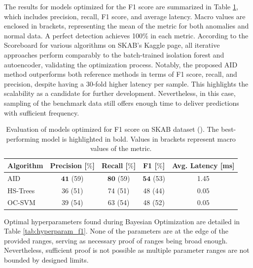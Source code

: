 The results for models optimized for the F1 score are summarized in Table \ref{tab:perf_comp_f1}, which includes precision, recall, F1 score, and average latency. Macro values are enclosed in brackets, representing the mean of the metric for both anomalies and normal data. A perfect detection achieves 100\% in each metric. According to the Scoreboard for various algorithms on SKAB's Kaggle page, all iterative approaches perform comparably to the batch-trained isolation forest and autoencoder, validating the optimization process. Notably, the proposed AID method outperforms both reference methods in terms of F1 score, recall, and precision, despite having a 30-fold higher latency per sample. This highlights the scalability as a candidate for further development. Nevertheless, in this case, sampling of the benchmark data still offers enough time to deliver predictions with sufficient frequency. 

\begin{table}[htbp]
\caption{Evaluation of models optimized for F1 score on SKAB dataset (\cite{skab2020}). The best-performing model is highlighted in bold. Values in brackets represent macro values of the metric.}
\begin{center}
\label{tab:perf_comp_f1}
\begin{tabular}{|l|c|c|c|c|}
 \hline
 \textbf{Algorithm} & Precision [$\%$] & Recall [$\%$] & F1 [$\%$] & Avg. Latency [ms] \\
 \hline
 AID & $\boldsymbol{41}$ (59) & $\boldsymbol{80}$ (59) & $\boldsymbol{54}$ (53) & 1.45 \\
 \hline
 HS-Trees & 36 (51) & 74 (51) & 48 (44) & $\boldsymbol{0.05}$ \\
 \hline
 OC-SVM & 39 (54) & 63 (54) & 48 (52) & $\boldsymbol{0.05}$ \\
 \hline
\end{tabular}
\end{center}
\end{table}

Optimal hyperparameters found during Bayesian Optimization are detailed in Table \ref{tab:hyperparam_f1}. None of the parameters are at the edge of the provided ranges, serving as necessary proof of ranges being broad enough. Nevertheless, sufficient proof is not possible as multiple parameter ranges are not bounded by designed limits.

